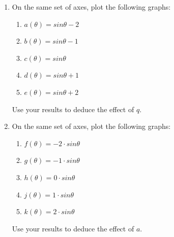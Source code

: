         \label{m39414*id84695}\begin{enumerate}[noitemsep, label=\textbf{\arabic*}. ] 
            \label{m39414*uid34}\item On the same set of axes, plot the following graphs:
\label{m39414*id84710}\begin{enumerate}[noitemsep, label=\textbf{\alph*}. ] 
            \label{m39414*uid35}\item \begin{math}a\left(\theta \right)=sin\theta -2\end{math}\label{m39414*uid36}\item \begin{math}b\left(\theta \right)=sin\theta -1\end{math}\label{m39414*uid37}\item \begin{math}c\left(\theta \right)=sin\theta \end{math}\label{m39414*uid38}\item \begin{math}d\left(\theta \right)=sin\theta +1\end{math}\label{m39414*uid39}\item \begin{math}e\left(\theta \right)=sin\theta +2\end{math}\end{enumerate}
        
Use your results to deduce the effect of \begin{math}q\end{math}.
\label{m39414*uid40}\item On the same set of axes, plot the following graphs:
\label{m39414*id84931}\begin{enumerate}[noitemsep, label=\textbf{\alph*}. ] 
            \label{m39414*uid41}\item \begin{math}f\left(\theta \right)=-2\ensuremath{\cdot}sin\theta \end{math}\label{m39414*uid42}\item \begin{math}g\left(\theta \right)=-1\ensuremath{\cdot}sin\theta \end{math}\label{m39414*uid43}\item \begin{math}h\left(\theta \right)=0\ensuremath{\cdot}sin\theta \end{math}\label{m39414*uid44}\item \begin{math}j\left(\theta \right)=1\ensuremath{\cdot}sin\theta \end{math}\label{m39414*uid45}\item \begin{math}k\left(\theta \right)=2\ensuremath{\cdot}sin\theta \end{math}\end{enumerate}
        
Use your results to deduce the effect of \begin{math}a\end{math}.
\end{enumerate}
        
